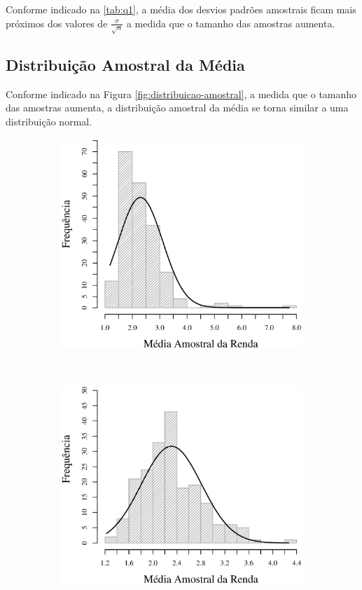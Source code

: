 	Conforme indicado na \autoref{tab:q1}, a média dos desvios padrões
	amostrais ficam mais próximos dos valores de $\frac{\sigma}{\sqrt{n}}$ a
	medida que o tamanho das amostras aumenta.

\subsection{Distribuição Amostral da Média}

	Conforme indicado na Figura \ref{fig:distribuicao-amostral}, a medida
	que o tamanho das amostras aumenta, a distribuição amostral da média se
	torna similar a uma distribuição normal.

\begin{figure}
	\centering
	\begin{subfigure}[b]{0.48\textwidth}
		\includegraphics[width=\textwidth]{plots/histogram_renda_m4.eps}
		\caption{}
		\label{fig:m4}
	\end{subfigure}
	~
	\begin{subfigure}[b]{0.48\textwidth}
		\includegraphics[width=\textwidth]{plots/histogram_renda_m8.eps}

\end{subfigure}
\end{figure}
